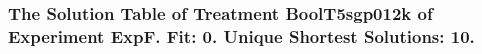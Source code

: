 \begin{frame}
 \fontsize{8pt}{9pt}\selectfont
 \frametitle{ The Solution Table of Treatment BoolT5sgp012k of Experiment ExpF. Fit: 0. Unique Shortest Solutions: 10. }

 \label{ExpFSolutionTable010.tex}  
 \end{frame}

